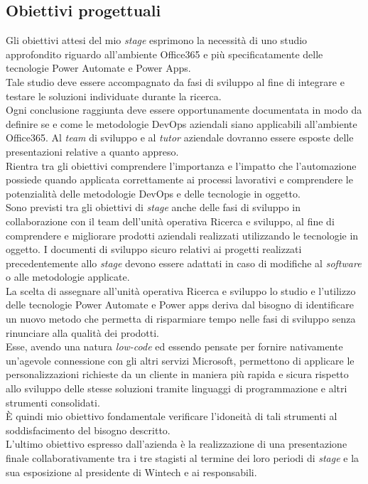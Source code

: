 \subsection{Obiettivi progettuali}
Gli obiettivi attesi del mio \emph{stage} esprimono la necessità di uno studio approfondito riguardo all'ambiente Office365 e più specificatamente delle tecnologie Power Automate e Power Apps.\\
Tale studio deve essere accompagnato da fasi di sviluppo al fine di integrare e testare le soluzioni individuate durante la ricerca.\\
Ogni conclusione raggiunta deve essere opportunamente documentata in modo da definire se e come le metodologie \gls{DevOps} aziendali siano applicabili all'ambiente Office365. Al \emph{team} di sviluppo e al \emph{tutor} aziendale dovranno essere esposte delle presentazioni relative a quanto appreso.\\
Rientra tra gli obiettivi comprendere l'importanza e l'impatto che l'automazione possiede quando applicata correttamente ai processi lavorativi e comprendere le potenzialità delle metodologie DevOps e delle tecnologie in oggetto.\\
Sono previsti tra gli obiettivi di \emph{stage} anche delle fasi di sviluppo in collaborazione con il team dell'unità operativa Ricerca e sviluppo, al fine di comprendere e migliorare prodotti aziendali realizzati utilizzando le tecnologie in oggetto. I documenti di sviluppo sicuro relativi ai progetti realizzati precedentemente allo \emph{stage} devono essere adattati in caso di modifiche al \emph{software} o alle metodologie applicate.\\
La scelta di assegnare all'unità operativa Ricerca e sviluppo lo studio e l'utilizzo delle tecnologie Power Automate e Power apps deriva dal bisogno di identificare un nuovo metodo che permetta di risparmiare tempo nelle fasi di sviluppo senza rinunciare alla qualità dei prodotti.\\
Esse, avendo una natura \emph{low-code} ed essendo pensate per fornire nativamente un'agevole connessione con gli altri servizi Microsoft, permettono di applicare le personalizzazioni richieste da un cliente in maniera più rapida e sicura rispetto allo sviluppo delle stesse soluzioni tramite linguaggi di programmazione e altri strumenti consolidati.\\
È quindi mio obiettivo fondamentale verificare l'idoneità di tali strumenti al soddisfacimento del bisogno descritto.\\
L'ultimo obiettivo espresso dall'azienda è la realizzazione di una presentazione finale collaborativamente tra i tre stagisti al termine dei loro periodi di \emph{stage} e la sua esposizione al presidente di Wintech e ai responsabili.\\\\

